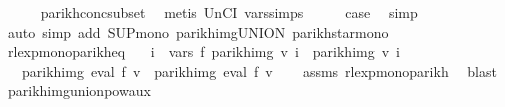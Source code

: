 \begin{isabellebody}
\ \ \ \ \isamarkupfalse%
\ parikh{\isacharunderscore}{\kern0pt}conc{\isacharunderscore}{\kern0pt}subset\ \isamarkupfalse%
\ {\isacharparenleft}{\kern0pt}metis\ UnCI\ vars{\isachardot}{\kern0pt}simps{\isacharparenleft}{\kern0pt}{}{\isacharparenright}{\kern0pt}{\isacharparenright}{\kern0pt}\isanewline
\ \ \isamarkupfalse%
\ \isamarkupfalse%
\ {\isacharquery}{\kern0pt}case\ \isamarkupfalse%
\ simp\isanewline
{}\isamarkupfalse%
\ {\isacharparenleft}{\kern0pt}auto\ simp\ add{\isacharcolon}{\kern0pt}\ SUP{\isacharunderscore}{\kern0pt}mono{\isacharprime}{\kern0pt}\ parikh{\isacharunderscore}{\kern0pt}img{\isacharunderscore}{\kern0pt}UNION\ parikh{\isacharunderscore}{\kern0pt}star{\isacharunderscore}{\kern0pt}mono{\isacharparenright}{\kern0pt}%
\endisatagproof
{\isafoldproof}%
%
\isadelimproof
\isanewline
%
\endisadelimproof
\isanewline
\isanewline
{}\isamarkupfalse%
\ rlexp{\isacharunderscore}{\kern0pt}mono{\isacharunderscore}{\kern0pt}parikh{\isacharunderscore}{\kern0pt}eq{\isacharcolon}{\kern0pt}\isanewline
\ \ \ {\isachardoublequoteopen}{\isasymforall}i\ {\isasymin}\ vars\ f{\isachardot}{\kern0pt}\ parikh{\isacharunderscore}{\kern0pt}img\ {\isacharparenleft}{\kern0pt}v\ i{\isacharparenright}{\kern0pt}\ {\isacharequal}{\kern0pt}\ parikh{\isacharunderscore}{\kern0pt}img\ {\isacharparenleft}{\kern0pt}v{\isacharprime}{\kern0pt}\ i{\isacharparenright}{\kern0pt}{\isachardoublequoteclose}\isanewline
\ \ \ {\isachardoublequoteopen}parikh{\isacharunderscore}{\kern0pt}img\ {\isacharparenleft}{\kern0pt}eval\ f\ v{\isacharparenright}{\kern0pt}\ {\isacharequal}{\kern0pt}\ parikh{\isacharunderscore}{\kern0pt}img\ {\isacharparenleft}{\kern0pt}eval\ f\ v{\isacharprime}{\kern0pt}{\isacharparenright}{\kern0pt}{\isachardoublequoteclose}\isanewline
%
\isadelimproof
\ \ %
\endisadelimproof
%
\isatagproof
{}\isamarkupfalse%
\ assms\ rlexp{\isacharunderscore}{\kern0pt}mono{\isacharunderscore}{\kern0pt}parikh\ \isamarkupfalse%
\ blast%
\endisatagproof
{\isafoldproof}%
%
\isadelimproof
%
\endisadelimproof
%
\isadelimdocument
%
\endisadelimdocument
%
\isatagdocument
%
\isamarkuptrue%
%
\endisatagdocument
{\isafolddocument}%
%
\isadelimdocument
%
\endisadelimdocument
{}\isamarkupfalse%
\ parikh{\isacharunderscore}{\kern0pt}img{\isacharunderscore}{\kern0pt}union{\isacharunderscore}{\kern0pt}pow{\isacharunderscore}{\kern0pt}aux{}{\isacharcolon}{\kern0pt}\isanewline

\end{isabellebody}
